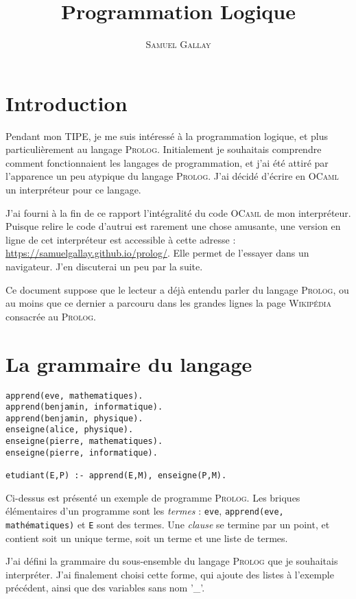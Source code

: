 \documentclass{article}
\title{Programmation Logique}
\author{\textsc{Samuel Gallay}}
\begin{document}
\maketitle

\section{Introduction}

Pendant mon TIPE, je me suis intéressé à la programmation logique, et plus particulièrement au langage \textsc{Prolog}. Initialement je souhaitais comprendre comment fonctionnaient les langages de programmation, et j'ai été attiré par l'apparence un peu atypique du langage \textsc{Prolog}. J'ai décidé d'écrire en \textsc{OCaml} un interpréteur pour ce langage.

J'ai fourni à la fin de ce rapport l'intégralité du code \textsc{OCaml} de mon interpréteur. Puisque relire le code d'autrui est rarement une chose amusante, une version en ligne de cet interpréteur est accessible à cette adresse : \url{https://samuelgallay.github.io/prolog/}. Elle permet de l'essayer dans un navigateur. J'en discuterai un peu par la suite.

Ce document suppose que le lecteur a déjà entendu parler du langage \textsc{Prolog}, ou au moins que ce dernier a parcouru dans les grandes lignes la page \textsc{Wikipédia} consacrée au \textsc{Prolog}.

\section{La grammaire du langage}

\begin{verbatim}
apprend(eve, mathematiques).
apprend(benjamin, informatique).
apprend(benjamin, physique).
enseigne(alice, physique).
enseigne(pierre, mathematiques).
enseigne(pierre, informatique).

etudiant(E,P) :- apprend(E,M), enseigne(P,M).
\end{verbatim}

Ci-dessus est présenté un exemple de programme \textsc{Prolog}. Les briques élémentaires d'un programme sont les \emph{termes} : \texttt{eve}, \texttt{apprend(eve, mathématiques)} et \texttt{E} sont des termes. Une \emph{clause} se termine par un point, et contient soit un unique terme, soit un terme et une liste de termes.

J'ai défini  la grammaire du sous-ensemble du langage \textsc{Prolog} que je souhaitais interpréter. J'ai finalement choisi cette forme, qui ajoute des listes à l'exemple précédent, ainsi que des variables sans nom '\_'.
\end{document}
